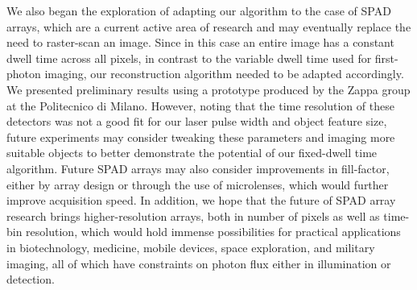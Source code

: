 We also began the exploration of adapting our algorithm to the case of SPAD arrays, which are a current active area of research and may eventually replace the need to raster-scan an image. Since in this case an entire image has a constant dwell time across all pixels, in contrast to the variable dwell time used for first-photon imaging, our reconstruction algorithm needed to be adapted accordingly. We presented preliminary results using a prototype produced by the Zappa group at the Politecnico di Milano. However, noting that the time resolution of these detectors was not a good fit for our laser pulse width and object feature size, future experiments may consider tweaking these parameters and imaging more suitable objects to better demonstrate the potential of our fixed-dwell time algorithm. Future SPAD arrays may also consider improvements in fill-factor, either by array design or through the use of microlenses, which would further improve acquisition speed. In addition, we hope that the future of SPAD array research brings higher-resolution arrays, both in number of pixels as well as time-bin resolution, which would hold immense possibilities for practical applications in biotechnology, medicine, mobile devices, space exploration, and military imaging, all of which have constraints on photon flux either in illumination or detection.

